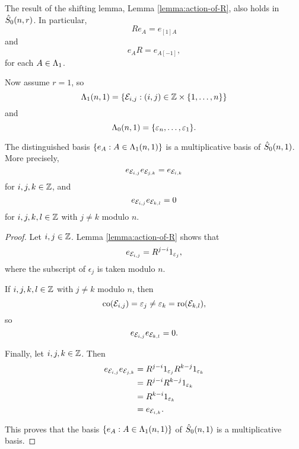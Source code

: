 \documentclass[a4paper, 11pt, twoside]{report}
\begin{document}
The result of the shifting lemma, Lemma \ref{lemma:action-of-R}, also holds in $\zeroschur$. In particular,
\begin{equation*}
Re_A = e_{[1]A}
\end{equation*}
and
\begin{equation*}
e_A R = e_{A[-1]},
\end{equation*}
for each $A\in\matrices$.

Now assume $r=1$, so
\begin{equation*}
\matrices[(n,1)] = \{\elem{i}{j}:(i,j)\in\integers\times\{1,\ldots,n\}\}
\end{equation*}
and
\begin{equation*}
\compositions[(n,1)] = \{\epsilon_n,\ldots,\epsilon_1\}.
\end{equation*}

\begin{lemma}\label{lemma:multiplicative-basis-rank-1}
The distinguished basis $\{e_A:A\in\matrices[(n,1)]\}$ is a multiplicative basis of $\zeroschur[n,1]$. More precisely,
\begin{equation*}
e_{\elem{i}{j}}e_{\elem{j}{k}} = e_{\elem{i}{k}}
\end{equation*}
for $i,j,k\in\integers$, and
\begin{equation*}
e_{\elem{i}{j}} e_{\elem{k}{l}} = 0
\end{equation*}
for $i,j,k,l\in\integers$ with $j\neq k$ modulo $n$.
\end{lemma}

\begin{proof}
Let $i,j\in\integers$. Lemma \ref{lemma:action-of-R} shows that
\begin{equation*}
e_{\elem{i}{j}} = R^{j-i} 1_{\epsilon_j},
\end{equation*}
where the subscript of $\epsilon_j$ is taken modulo $n$.

If $i,j,k,l\in\integers$ with $j\neq k$ modulo $n$, then
\begin{equation*}
\co{\elem{i}{j}} = \epsilon_j \neq \epsilon_k = \ro{\elem{k}{l}},
\end{equation*}
so
\begin{equation*}
e_{\elem{i}{j}}e_{\elem{k}{l}} = 0.
\end{equation*}

Finally, let $i,j,k\in\integers$. Then
\begin{align*}
e_{\elem{i}{j}} e_{\elem{j}{k}} &= R^{j-i} 1_{\epsilon_j} R^{k-j} 1_{\epsilon_k}\\
&= R^{j-i}R^{k-j} 1_{\epsilon_k}\\
&= R^{k-i} 1_{\epsilon_k}\\	
&= e_{\elem{i}{k}}.
\end{align*}

This proves that the basis $\{e_A:A\in\matrices[(n,1)]\}$ of $\zeroschur[n,1]$ is a multiplicative basis.
\end{proof}
\end{document}

